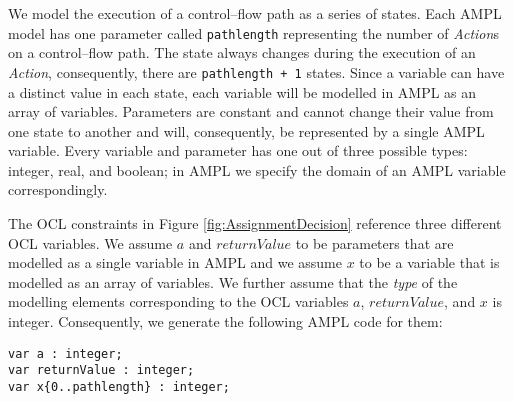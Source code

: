 \documentclass[runningheads,a4paper]{llncs}%
\newcommand{\UMLType}[1]{\textsf{\textit{#1}}} %
\newcommand{\UMLReference}[1]{\textsf{\textit{#1}}} %
\newcommand{\AMPLCode}[1]{\texttt{#1}}
\begin{document}
We model the execution of a control--flow path as a series of states. Each AMPL model has one parameter called \AMPLCode{pathlength} representing the number of \UMLType{Action}s on a control--flow path. The state always changes during the execution of an \UMLType{Action}, consequently, there are \AMPLCode{pathlength + 1} states. Since a variable can have a distinct value in each state, each variable will be modelled in AMPL as an array of variables. Parameters are constant and cannot change their value from one state to another and will, consequently, be represented by a single AMPL variable. Every variable and parameter has one out of three possible types: integer, real, and boolean; in AMPL we specify the domain of an AMPL variable correspondingly.

The OCL constraints in Figure \ref{fig:AssignmentDecision} reference three different OCL variables. We assume $a$ and $returnValue$ to be parameters that are modelled as a single variable in AMPL and we assume $x$ to be a variable that is modelled as an array of variables. We further assume that the \UMLReference{type} of the modelling elements corresponding to the OCL variables $a$, ${returnValue}$, and $x$ is integer. Consequently, we generate the following AMPL code for them: %
\begin{lstlisting}[basicstyle=\ttfamily,language=ampl]
var a : integer;
var returnValue : integer;
var x{0..pathlength} : integer;
\end{lstlisting}%
\end{document}
